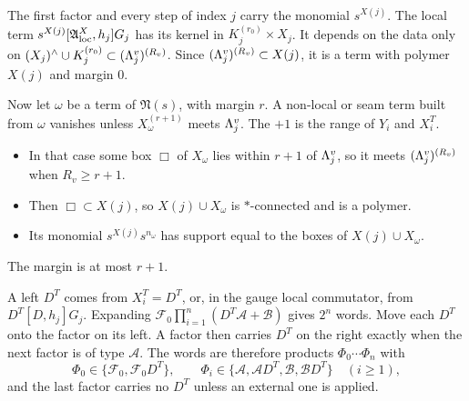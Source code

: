 \begin{detail}\label{d9:wstep}
\begin{step}[Polymers]
The first factor and every step of index $j$ carry the monomial $s^{X(j)}$. The local term $s^{X(j)}[\mathfrak A^X_{\rm loc},h_j]G_j$ has its kernel in $K_j^{(r_0)}\times X_j$. It depends on the data only on $(X_j)^\wedge\cup K_j^{(r_0)}\subset(\Lambda^v_j)^{(R_v)}$. Since $(\Lambda^v_j)^{(R_v)}\subset X(j)$, it is a term with polymer $X(j)$ and margin $0$.

Now let $\omega$ be a term of $\mathfrak N(s)$, with margin $r$. A non-local or seam term built from $\omega$ vanishes unless $X_\omega^{(r+1)}$ meets $\Lambda^v_j$. The $+1$ is the range of $Y_i$ and $X_i^T$.
\begin{itemize}
\item In that case some box $\Box$ of $X_\omega$ lies within $r+1$ of $\Lambda^v_j$, so it meets $(\Lambda^v_j)^{(R_v)}$ when $R_v\ge r+1$.
\item Then $\Box\subset X(j)$, so $X(j)\cup X_\omega$ is $*$-connected and is a polymer.
\item Its monomial $s^{X(j)}s^{n_\omega}$ has support equal to the boxes of $X(j)\cup X_\omega$.
\end{itemize}
The margin is at most $r+1$.
\end{step}
\begin{step}
A left $D^T$ comes from $X_i^T=D^T$, or, in the gauge local commutator, from $D^T[D,h_j]G_j$. Expanding $\mathcal F_0\prod_{i=1}^n(D^T\mathcal A+\mathcal B)$ gives $2^n$ words. Move each $D^T$ onto the factor on its left. A factor then carries $D^T$ on the right exactly when the next factor is of type $\mathcal A$. The words are therefore products $\Phi_0\cdots\Phi_n$ with
\[
\Phi_0\in\{\mathcal F_0,\mathcal F_0D^T\},\qquad\Phi_i\in\{\mathcal A,\mathcal AD^T,\mathcal B,\mathcal BD^T\}\quad(i\ge1),
\]
and the last factor carries no $D^T$ unless an external one is applied.
\end{step}
\end{detail}

